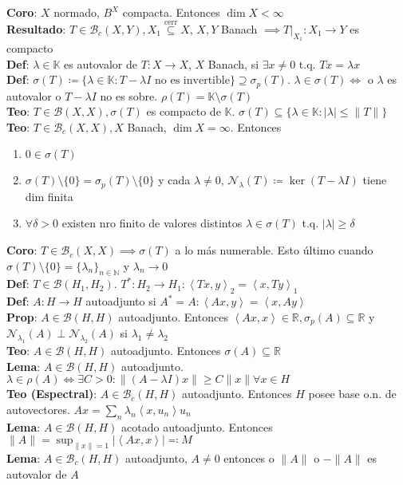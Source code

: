 \documentclass[9pt]{extarticle}
\newcommand{\N}{\mathbb{N}}
\newcommand{\R}{\mathbb{R}}
\newcommand{\K}{\mathbb{K}}
\newcommand{\inn}[1]{\left\langle #1\right\rangle}
\begin{document}
\begin{multicols*}{2}
\textbf{Coro}: $X$ normado, $B^X$ compacta. Entonces $\operatorname{dim}X<\infty$\\
\textbf{Resultado}: $T\in\mathcal{B}_c(X,Y), X_1\overset{\text{cerr}}{\subseteq}X$, $X,Y$ Banach $\implies T\big|_{X_1}:X_1\to Y$ es compacto\\
\textbf{Def}: $\lambda\in\K$ es autovalor de $T:X\to X$, $X$ Banach, si $\exists x\neq 0$ t.q. $Tx=\lambda x$\\
\textbf{Def}: $\sigma(T)\coloneqq \{\lambda\in\K:T-\lambda I\text{ no es invertible}\}\supseteq \sigma_p(T)$. $\lambda\in \sigma(T)\iff$ o $\lambda$ es autovalor o $T-\lambda I$ no es sobre. $\rho(T)=\K\setminus \sigma(T)$\\
\textbf{Teo}: $T\in\mathcal{B}(X,X), \sigma(T)$ es compacto de $\K$. $\sigma(T)\subseteq \{\lambda\in\K:|\lambda|\leq \|T\|\}$\\
\textbf{Teo}: $T\in\mathcal{B}_c(X,X), X$ Banach, $\operatorname{dim} X=\infty$. Entonces \begin{enumerate}
	\item $0\in\sigma(T)$
	\item $\sigma(T)\setminus\{0\}=\sigma_p(T)\setminus\{0\}$ y cada $\lambda\neq 0$, $\mathcal{N}_\lambda(T)\coloneqq \operatorname{ker}(T-\lambda I)$ tiene dim finita 
	\item $\forall \delta>0$ existen nro finito de valores distintos $\lambda\in\sigma(T)$ t.q. $|\lambda|\geq \delta$
\end{enumerate}
\textbf{Coro}: $T\in\mathcal{B}_c(X,X)\implies \sigma(T)$ a lo más numerable. Esto último cuando $\sigma(T)\setminus\{0\}=\{\lambda_n\}_{n\in\N}$ y $\lambda_n\to 0$\\
\textbf{Def}: $T\in\mathcal{B}(H_1,H_2)$. $T^*:H_2\to H_1:\inn{Tx,y}_2=\inn{x,Ty}_1$\\
\textbf{Def}: $A:H\to H$ autoadjunto si $A^*=A: \inn{Ax,y}=\inn{x,Ay}$\\
\textbf{Prop}: $A\in\mathcal{B}(H,H)$ autoadjunto. Entonces $\inn{Ax,x}\in\R, \sigma_p(A)\subseteq \R$ y $\mathcal{N}_{\lambda_1}(A)\perp\mathcal{N}_{\lambda_2}(A)$ si $\lambda_1\neq\lambda_2$\\
\textbf{Teo}: $A\in\mathcal{B}(H,H)$ autoadjunto. Entonces $\sigma(A)\subseteq \R$\\
\textbf{Lema}: $A\in\mathcal{B}(H,H)$ autoadjunto. $\lambda\in\rho(A)\iff \exists C>0:\|(A-\lambda I)x\|\geq C\|x\|\forall x\in H$\\
\textbf{Teo (Espectral)}: $A\in\mathcal{B}_c(H,H)$ autoadjunto. Entonces $H$ posee base o.n. de autovectores. $Ax=\sum_n \lambda_n\inn{x,u_n}u_n$\\
\textbf{Lema}: $A\in\mathcal{B}(H,H)$ acotado autoadjunto. Entonces $\|A\|=\sup_{\|x\|=1}|\inn{Ax,x}|\eqqcolon M$\\
\textbf{Lema}: $A\in\mathcal{B}_c(H,H)$ autoadjunto, $A\neq 0$ entonces o $\|A\|$ o $-\|A\|$ es autovalor de $A$

\end{multicols*}
\end{document}
